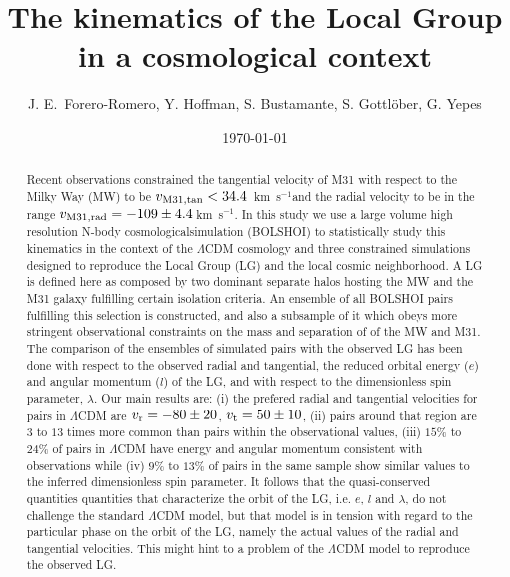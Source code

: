 \documentclass{emulateapj}
\newcommand{\kms}{\,km~s$^{-1}$}
\begin{document}
\title{The kinematics of the Local Group in a cosmological context}
\author{
J. E.\ Forero-Romero, 
Y. Hoffman, 
S. Bustamante, 
S. Gottl\"ober, 
G. Yepes
}


\date{\today}

\begin{abstract}
Recent observations constrained the tangential velocity of M31 with
respect to the Milky Way (MW) to be $v_{\rm M31,tan}<34.4$ \kms and
the radial velocity to be in the range $v_{\rm M31,rad}=-109\pm
4.4$\kms \citep{vanderMarel12}. In this study we use a large volume
high resolution N-body cosmologicalsimulation (BOLSHOI) to
statistically study this kinematics in the context of the $\Lambda$CDM
cosmology and three constrained simulations designed to reproduce the
Local Group (LG) and the local cosmic neighborhood. A LG is defined
here as  composed by two dominant separate halos hosting the MW and
the M31 galaxy fulfilling certain isolation criteria. An ensemble  of
all BOLSHOI pairs fulfilling this selection is constructed, and also a
subsample of it which obeys  more stringent observational constraints
on the mass and separation of of the MW and M31. The comparison of the
ensembles of simulated pairs with the observed LG has been done with
respect to the observed radial and tangential,  the reduced orbital
energy ($e$) and angular momentum ($l$) of the LG, and with respect to
the dimensionless spin parameter, $\lambda$. Our main results are: (i)
the prefered radial and tangential velocities for pairs in $\Lambda$CDM
are $v_{\rm r}=-80\pm 20$, $v_{\rm t}=50\pm 10$, (ii) pairs around
that region are $3$ to $13$ times more common than pairs within the
observational values, (iii) $15\%$ to $24\%$ of pairs in $\Lambda$CDM have
energy and angular momentum consistent with observations while (iv) $9\%$
to $13\%$ of pairs in the same sample show similar values to the inferred dimensionless spin
parameter. It follows that the quasi-conserved quantities quantities that
characterize the orbit of the LG, i.e. $e$, $l$ and $\lambda$, do not
challenge the standard $\Lambda$CDM model, but that model is in
tension with regard to the particular phase on the orbit of the LG,
namely the actual values of the radial and tangential velocities. This
might hint to a problem of the $\Lambda$CDM model to reproduce the
observed LG.  

\end{abstract}
\end{document}
